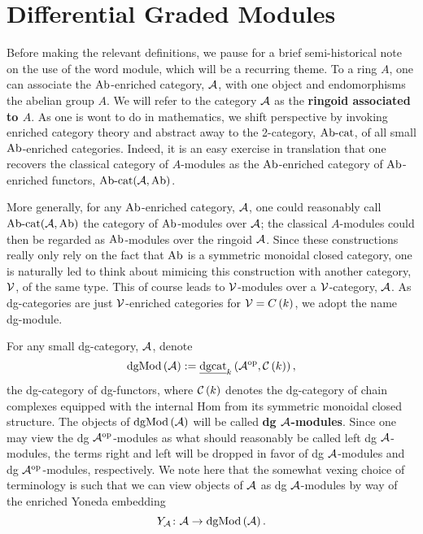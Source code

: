 \section{Differential Graded Modules}\label{subsection: dg modules}
Before making the relevant definitions, we pause for a brief semi-historical note on the use of the word module, which will be a recurring theme.
To a ring $A$, one can associate the $\operatorname{Ab}$-enriched category, \(\mathcal{A}\), with one object and endomorphisms the abelian group $A$.
We will refer to the category $\mathcal{A}$ as the \textbf{ringoid associated to $A$}.
As one is wont to do in mathematics, we shift perspective by invoking enriched category theory and abstract away to the 2-category, $\operatorname{Ab-cat}$, of all small $\operatorname{Ab}$-enriched categories.
Indeed, it is an easy exercise in translation that one recovers the classical category of $A$-modules as the $\operatorname{Ab}$-enriched category of $\operatorname{Ab}$-enriched functors, $\operatorname{Ab-cat}(\mathcal{A}, \operatorname{Ab})$.

More generally, for any $\operatorname{Ab}$-enriched category, $\mathcal{A}$, one could reasonably call $\operatorname{Ab-cat}(\mathcal{A},\operatorname{Ab})$ the category of $\operatorname{Ab}$-modules over $\mathcal{A}$; the classical $A$-modules could then be regarded as $\operatorname{Ab}$-modules over the ringoid $\mathcal{A}$.
Since these constructions really only rely on the fact that $\operatorname{Ab}$ is a symmetric monoidal closed category, one is naturally led to think about mimicing this construction with another category, $\mathcal{V}$, of the same type.
This of course leads to $\mathcal{V}$-modules over a $\mathcal{V}$-category, $\mathcal{A}$.
As dg-categories are just $\mathcal{V}$-enriched categories for $\mathcal{V} = C\left(k\right)$, we adopt the name dg-module.

For any small dg-category, \(\mathcal{A}\), denote
\[\operatorname{dgMod}\left(\mathcal{A}\right) := \underline{\operatorname{dgcat}}_{k}\left(\mathcal{A}^{{\operatorname{op}}},\mathcal{C}\left(k\right)\right),\]
the dg-category of dg-functors, where \(\mathcal{C}\left(k\right)\) denotes the dg-category of chain complexes equipped with the internal Hom from its symmetric monoidal closed structure.
The objects of \(\operatorname{dgMod}\left(\mathcal{A}\right)\) will be called \textbf{dg \(\mathcal{A}\)-modules}.
Since one may view the dg \(\mathcal{A}^{{\operatorname{op}}}\)-modules as what should reasonably be called left dg \(\mathcal{A}\)-modules, the terms right and left will be dropped in favor of dg \(\mathcal{A}\)-modules and dg \(\mathcal{A}^{{\operatorname{op}}}\)-modules, respectively.
We note here that the somewhat vexing choice of terminology is such that we can view objects of \(\mathcal{A}\) as dg \(\mathcal{A}\)-modules by way of the enriched Yoneda embedding
\[Y_{\mathcal{A}} \colon \mathcal{A} \to \operatorname{dgMod}\left(\mathcal{A}\right).\]


